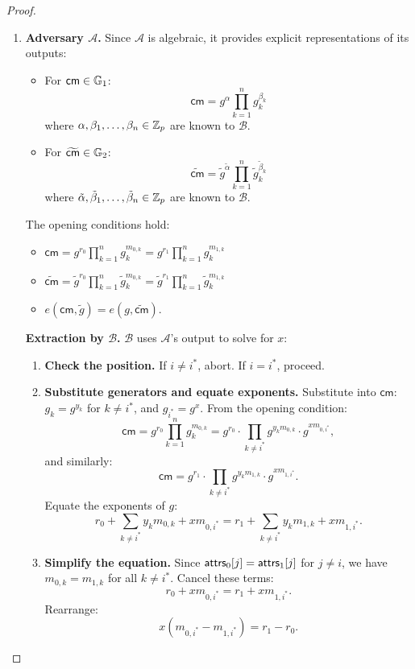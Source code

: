 \begin{proof}
\begin{enumerate}
    
      \item  \textbf{Adversary $\mathcal{A}$.} Since $\mathcal{A}$ is algebraic, it provides explicit representations of its outputs:
        \begin{itemize}
            \item For $\mathsf{cm} \in \mathbb{G}_1$: 
            $$\mathsf{cm} = g^{\alpha} \prod_{k=1}^n g_k^{\beta_k}$$
            where $\alpha, \beta_1, \ldots, \beta_n \in \mathbb{Z}_p$ are known to $\mathcal{B}$.
            \item For $\widetilde{\mathsf{cm}} \in \mathbb{G}_2$: 
            $$\widetilde{\mathsf{cm}} = \tilde{g}^{\tilde{\alpha}} \prod_{k=1}^n \tilde{g}_k^{\tilde{\beta}_k}$$
            where $\tilde{\alpha}, \tilde{\beta}_1, \ldots, \tilde{\beta}_n \in \mathbb{Z}_p$ are known to $\mathcal{B}$.
        \end{itemize}
        The opening conditions hold:
        \begin{itemize}
            \item $\mathsf{cm} = g^{r_0} \prod_{k=1}^n g_k^{m_{0,k}} = g^{r_1} \prod_{k=1}^n g_k^{m_{1,k}}$
            \item $\widetilde{\mathsf{cm}} = \tilde{g}^{r_0} \prod_{k=1}^n \tilde{g}_k^{m_{0,k}} = \tilde{g}^{r_1} \prod_{k=1}^n \tilde{g}_k^{m_{1,k}}$
            \item $e(\mathsf{cm}, \tilde{g}) = e(g, \widetilde{\mathsf{cm}})$.
        \end{itemize}


\textbf{Extraction by $\mathcal{B}$.} $\mathcal{B}$ uses $\mathcal{A}$'s output to solve for $x$:

\begin{enumerate}
        \item \textbf{Check the position.} If $i \neq i^*$, abort. If $i = i^*$, proceed.
        
        \item \textbf{Substitute generators and equate exponents.} Substitute into $\mathsf{cm}$: $g_k = g^{y_k}$ for $k \neq i^*$, and $g_{i^*} = g^x$. From the opening condition:
        $$\mathsf{cm} = g^{r_0} \prod_{k=1}^n g_k^{m_{0,k}} = g^{r_0} \cdot \prod_{k \neq i^*} g^{y_k m_{0,k}} \cdot g^{x m_{0,i^*}},$$
        and similarly:
        $$\mathsf{cm} = g^{r_1} \cdot \prod_{k \neq i^*} g^{y_k m_{1,k}} \cdot g^{x m_{1,i^*}}.$$
        Equate the exponents of $g$:
        $$r_0 + \sum_{k \neq i^*} y_k m_{0,k} + x m_{0,i^*} = r_1 + \sum_{k \neq i^*} y_k m_{1,k} + x m_{1,i^*}.$$
        
        \item \textbf{Simplify the equation.} Since $\mathsf{attrs}_0[j] = \mathsf{attrs}_1[j]$ for $j \neq i$, we have $m_{0,k} = m_{1,k}$ for all $k \neq i^*$. Cancel these terms:
        $$r_0 + x m_{0,i^*} = r_1 + x m_{1,i^*}.$$
        Rearrange:
        $$x (m_{0,i^*} - m_{1,i^*}) = r_1 - r_0.$$
        

\end{enumerate}
\end{enumerate}
\end{proof}
